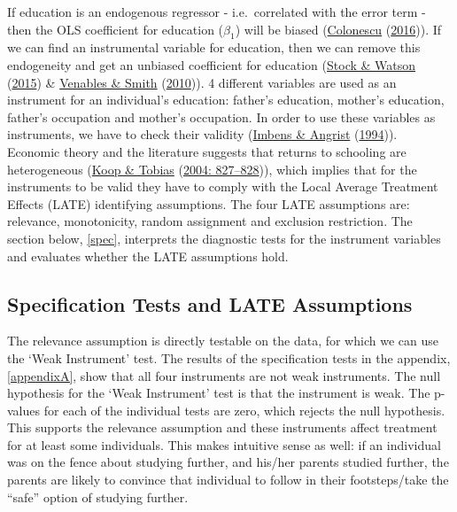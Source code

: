 \documentclass[11pt,preprint, authoryear]{elsarticle}
\numberwithin{equation}{section}
\numberwithin{figure}{section}
\numberwithin{table}{section}
\begin{document}
If education is an endogenous regressor - i.e.~correlated with the error
term - then the OLS coefficient for education (\(\beta_{1}\)) will be
biased (\protect\hyperlink{ref-R}{Colonescu}
(\protect\hyperlink{ref-R}{2016})). If we can find an instrumental
variable for education, then we can remove this endogeneity and get an
unbiased coefficient for education
(\protect\hyperlink{ref-metrics}{Stock \& Watson}
(\protect\hyperlink{ref-metrics}{2015}) \&
\protect\hyperlink{ref-metrics1}{Venables \& Smith}
(\protect\hyperlink{ref-metrics1}{2010})). 4 different variables are
used as an instrument for an individual's education: father's education,
mother's education, father's occupation and mother's occupation. In
order to use these variables as instruments, we have to check their
validity (\protect\hyperlink{ref-ang}{Imbens \& Angrist}
(\protect\hyperlink{ref-ang}{1994})). Economic theory and the literature
suggests that returns to schooling are heterogeneous
(\protect\hyperlink{ref-return}{Koop \& Tobias}
(\protect\hyperlink{ref-return}{2004: 827--828})), which implies that
for the instruments to be valid they have to comply with the Local
Average Treatment Effects (LATE) identifying assumptions. The four LATE
assumptions are: relevance, monotonicity, random assignment and
exclusion restriction. The section below, \ref{spec}, interprets the
diagnostic tests for the instrument variables and evaluates whether the
LATE assumptions hold.

\hypertarget{specification-tests-and-late-assumptions}{%
\subsection{\texorpdfstring{Specification Tests and LATE
Assumptions\label{spec}}{Specification Tests and LATE Assumptions}}\label{specification-tests-and-late-assumptions}}

The relevance assumption is directly testable on the data, for which we
can use the `Weak Instrument' test. The results of the specification
tests in the appendix, \ref{appendixA}, show that all four instruments
are not weak instruments. The null hypothesis for the `Weak Instrument'
test is that the instrument is weak. The p-values for each of the
individual tests are zero, which rejects the null hypothesis. This
supports the relevance assumption and these instruments affect treatment
for at least some individuals. This makes intuitive sense as well: if an
individual was on the fence about studying further, and his/her parents
studied further, the parents are likely to convince that individual to
follow in their footsteps/take the ``safe'' option of studying further.
\end{document}
